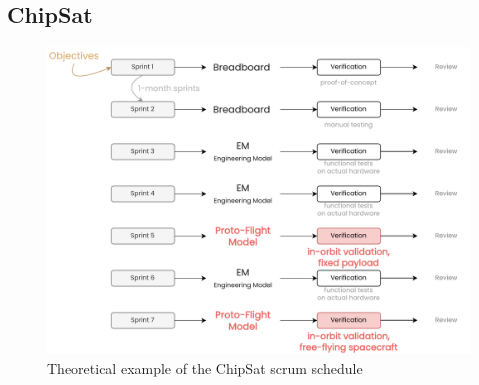 \documentclass[]{iac}
\begin{document}
\subsection{ChipSat}
\begin{figure}[]
    \centering
    \includegraphics[width=\linewidth]{media/ChipSatImaginary.drawio.pdf}
    \caption{Theoretical example of the ChipSat scrum schedule}
    \label{fig:theoretical_chipsat}
\end{figure}
\end{document}
